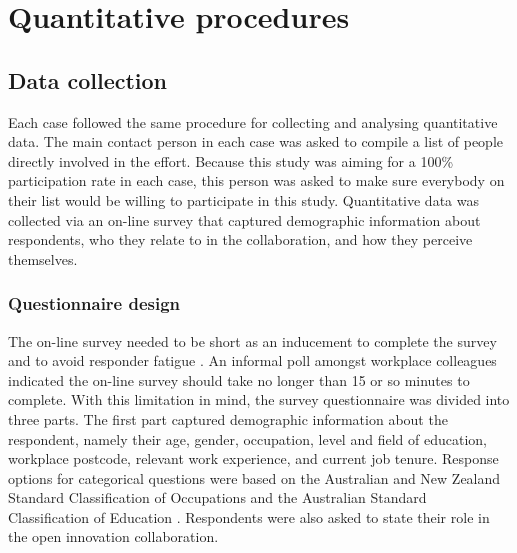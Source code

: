 \section{Quantitative procedures}



\subsection{Data collection}

Each case followed the same procedure for collecting and analysing quantitative data. The main contact person in each case was asked to compile a list of people directly involved in the effort. Because this study was aiming for a 100\% participation rate in each case, this person was asked to make sure everybody on their list would be willing to participate in this study. Quantitative data was collected via an on-line survey that captured demographic information about respondents, who they relate to in the collaboration, and how they perceive themselves.\medskip

\subsubsection{Questionnaire design}

The on-line survey needed to be short as an inducement to complete the survey and to avoid responder fatigue \citep{crawford2001web,van2006conducting}. An informal poll amongst workplace colleagues indicated the on-line survey should take no longer than 15 or so minutes to complete. With this limitation in mind, the survey questionnaire was divided into three parts. The first part captured demographic information about the respondent, namely their age, gender, occupation, level and field of education, workplace postcode, relevant work experience, and current job tenure. Response options for categorical questions were based on the Australian and New Zealand Standard Classification of Occupations \citep{pink2009anzsco} and the Australian Standard Classification of Education \citep{trewin2000australian}. Respondents were also asked to state their role in the open innovation collaboration.\medskip

